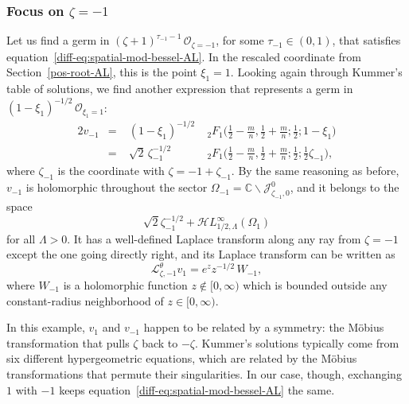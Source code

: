 \documentclass{article}
\newcommand{\singexp}[2]{\mathcal{H}L^\infty_{#1, #2}}
\newcommand{\C}{\mathbb{C}}
\newcommand{\laplace}{\mathcal{L}}
\theoremstyle{definition}
\theoremstyle{plain}
\begin{document}
\subsubsection{Focus on $\zeta = -1$}\label{neg-root-AL}
%
Let us find a germ in $(\zeta+1)^{\tau_{-1}-1}\,\mathcal{O}_{\zeta=-1}$, for some $\tau_{-1} \in (0, 1)$, that satisfies equation~\eqref{diff-eq:spatial-mod-bessel-AL}. In the rescaled coordinate from Section~\ref{pos-root-AL}, this is the point $\xi_1 = 1$. Looking again through Kummer's table of solutions, we find another expression \cite[formula~15.10.14]{dlmf} that represents a germ in $(1-\xi_1)^{-1/2}\,\mathcal{O}_{\xi_1=1}$:
\begin{alignat*}{2}
v_{-1} &=\;& (1-\xi_1)^{-1/2} &\;{}_2F_1\big(\tfrac{1}{2}-\tfrac{m}{n}, \tfrac{1}{2}+\tfrac{m}{n}; \tfrac{1}{2}; 1-\xi_1\big) \\[1mm]
&=\;& \sqrt{2}\,\zeta_{-1}^{-1/2} &\;{}_2F_1\big(\tfrac{1}{2}-\tfrac{m}{n}, \tfrac{1}{2}+\tfrac{m}{n}; \tfrac{1}{2}; \tfrac{1}{2}\zeta_{-1}\big),
\end{alignat*}
where $\zeta_{-1}$ is the coordinate with $\zeta = -1 + \zeta_{-1}$. By the same reasoning as before, $v_{-1}$ is holomorphic throughout the sector $\Omega_{-1} = \C \smallsetminus \mathcal{J}^0_{\zeta_{-1}, 0}$, and it belongs to the space
\[ \sqrt{2}\zeta_{-1}^{-1/2} + \singexp{1/2}{\Lambda}(\Omega_1) \]
for all $\Lambda > 0$. It has a well-defined Laplace transform along any ray from $\zeta = -1$ except the one going directly right, and its Laplace transform can be written as
\[ \laplace^\theta_{\zeta, -1} v_1 = e^z z^{-1/2}\,W_{-1}, \]
where $W_{-1}$ is a holomorphic function $z \notin [0, \infty)$ which is bounded outside any constant-radius neighborhood of $z \in [0, \infty)$.


In this example, $v_1$ and $v_{-1}$ happen to be related by a symmetry: the M\"{o}bius transformation that pulls $\zeta$ back to $-\zeta$. Kummer's solutions typically come from six different hypergeometric equations, which are related by the M\"{o}bius transformations that permute their singularities. In our case, though, exchanging $1$ with $-1$ keeps equation~\eqref{diff-eq:spatial-mod-bessel-AL} the same.
\end{document}
